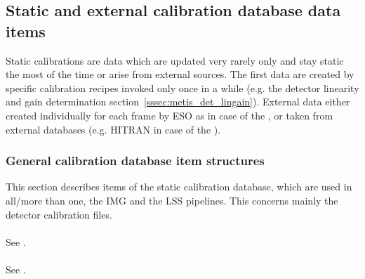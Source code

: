 
\subsection{Static and external calibration database data items}\label{ssec:caldb_items_structures}
Static calibrations are data which are updated very rarely only and stay static the most of the time or arise from external sources. The first data are created by specific calibration recipes invoked only once in a while (e.g. the detector linearity and gain determination section~\ref{sssec:metis_det_lingain}). External data either created individually for each frame by \ac{ESO} as in case of the \hyperref[dataitem:persistence_map]{}, or taken from external databases (e.g. \ac{HITRAN} in case of the \hyperref[dataitem:atm_line_cat]{}).

\subsubsection{General calibration database item structures}\label{sssec:generalcaldbdatastructs}
This section describes items of the static calibration database, which are used in all/more than one, the \ac{IMG} and the \ac{LSS} pipelines. This concerns mainly the detector calibration files.

\paragraph{\hyperref[dataitem:persistence_map]{}}\label{dataitem:persistence_map}

\paragraph{\hyperref[dataitem:gain_map_det]{}}\label{dataitem:gain_map_det}\label{dataitem:gainmap}

\paragraph{\hyperref[dataitem:gain_map_lm]{}}\label{dataitem:gain_map_lm}
See \hyperref[dataitem:gain_map_det]{}.

\paragraph{\hyperref[dataitem:gain_map_n]{}}\label{dataitem:gain_map_n}
See \hyperref[dataitem:gain_map_det]{}.

